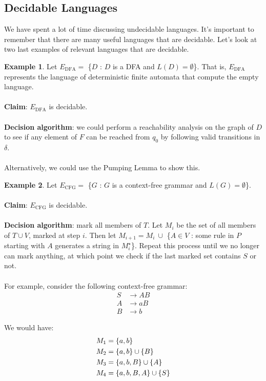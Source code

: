 \documentclass[]{article}
\DeclarePairedDelimiter{\set}{\lbrace}{\rbrace}
\theoremstyle{definition}
\newtheorem{ex}{Example}[section]
\begin{document}
    \subsection{Decidable Languages}
      We have spent a lot of time discussing undecidable languages. It's important to remember that there are many useful languages that are decidable. Let's look at two last examples of relevant languages that are decidable.

      \begin{ex}
        Let $E_\text{DFA} = $ \{$D$ : $D$ is a DFA and $L(D) = \emptyset$\}. That is, $E_\text{DFA}$ represents the language of deterministic finite automata that compute the empty language.
        \\ \\
        \textbf{Claim}: $E_\text{DFA}$ is decidable.
        \\ \\
        \textbf{Decision algorithm}: we could perform a reachability analysis on the graph of $D$ to see if any element of $F$ can be reached from $q_0$ by following valid transitions in $\delta$.
        \\ \\
        Alternatively, we could use the Pumping Lemma to show this.
      \end{ex}

      \begin{ex}
        Let $E_\text{CFG} = $ \{$G$ : $G$ is a context-free grammar and $L(G) = \emptyset$\}.
        \\ \\
        \textbf{Claim}: $E_\text{CFG}$ is decidable.
        \\ \\
        \textbf{Decision algorithm}: mark all members of $T$. Let $M_i$ be the set of all members of $T \cup V$, marked at step $i$. Then let $M_{i + 1} = M_i~ \cup $ \{$A \in V$ : some rule in $P$ starting with $A$ generates a string in $M_i^\star$\}. Repeat this process until we no longer can mark anything, at which point we check if the last marked set contains $S$ or not.
        \\ \\
        For example, consider the following context-free grammar:
        \begin{align*}
          S &\to AB \\
          A &\to aB \\
          B &\to b
        \end{align*}

        We would have:
        \begin{align*}
          M_1 &= \set{a, b} \\
          M_2 &= \set{a, b} \cup \set{B} \\
          M_3 &= \set{a, b, B} \cup \set{A} \\
          M_4 &= \set{a, b, B, A} \cup \set{S}
        \end{align*}
      \end{ex}
\end{document}
